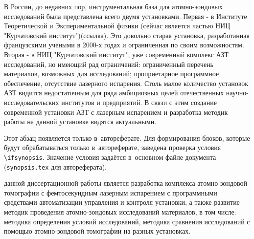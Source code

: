 В России, до недавних пор, инструментальная база для атомно-зондовых исследований была представлена всего двумя установками. Первая - в Институте Теоретической и Экспериментальной физики (сейчас является частью НИЦ "Курчатовский институт")(ссылка). Это довольно старая установка, разработанная французскими учеными в 2000-х годах и ограниченная по своим возможностям. Вторая - в НИЦ "Курчатовский институт", уже современный комплекс АЗТ исследований, но имеющий рад ограничений: ограниченный перечень материалов, возможных для исследований; проприетарное программное обеспечение, отсутствие лазерного испарения. Столь малое количество установок АЗТ видится недостаточным для ряда амбициозных целей отечественных научно-исследовательских институтов и предприятий. В связи с этим создание современной установки АЗТ с лазерным испарением и разработка методик работы на данной установке видятся актуальными.

\ifsynopsis
Этот абзац появляется только в~автореферате.
Для формирования блоков, которые будут обрабатываться только в~автореферате,
заведена проверка условия \verb!\!\verb!ifsynopsis!.
Значение условия задаётся в~основном файле документа (\verb!synopsis.tex! для
автореферата).
\else
\fi


{\aim} данной диссертационной работы является разработка комплекса атомно-зондовой томографии с фемтосекундным лазерным испарением с программными средствами автоматизации управления и контроля установки, а также развитие методик проведения атомно-зондовых исследований материалов, в том числе: методика определения условий исследований, методика сравнения исследований с помощью атомно-зондовой томографии на разных установках.


